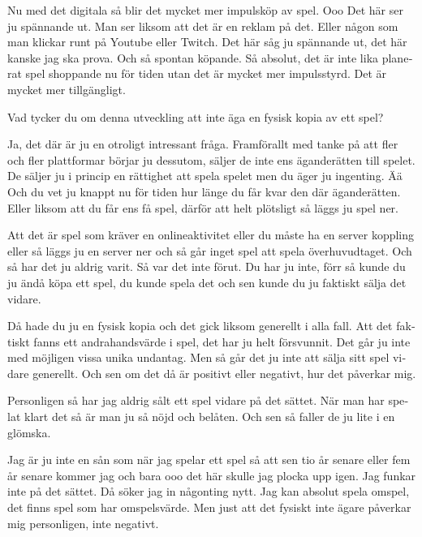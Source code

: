 \documentclass[11p]{article}
\begin{document}
\begin{otherlanguage}{swedish}
        Nu med det digitala så blir det mycket mer impulsköp av spel. Ooo Det här ser ju spännande ut.
        Man ser liksom att det är en reklam på det. Eller någon som man klickar runt på  Youtube eller Twitch. Det här såg ju spännande ut, det här kanske jag ska prova. Och så spontan köpande.
        Så absolut, det är inte lika planerat spel shoppande nu för tiden utan det är mycket mer impulsstyrd. Det är mycket mer tillgängligt.


        \setlength{\leftskip}{0cm}
        Vad tycker du om denna utveckling att inte äga en fysisk kopia av ett spel?

        \setlength{\leftskip}{1cm}

        Ja, det där är ju en otroligt intressant fråga.
        Framförallt med tanke på att fler och fler plattformar börjar ju dessutom, säljer de inte ens äganderätten till spelet.
        De säljer ju i princip en rättighet att spela spelet men du äger ju ingenting. Ää Och du vet ju knappt nu för tiden hur länge du får kvar den där äganderätten.
        Eller liksom att du får ens få spel, därför att helt plötsligt så läggs ju spel ner.

        Att det är spel som kräver en onlineaktivitet eller du måste ha en server koppling eller så läggs ju en server ner och så går inget spel att spela överhuvudtaget. Och så har det ju aldrig varit.
        Så var det inte förut. Du har ju inte, förr så kunde du ju ändå köpa ett spel, du kunde spela det och sen kunde du ju faktiskt sälja det vidare.

        Då hade du ju en fysisk kopia och det gick liksom generellt i alla fall. Att det faktiskt fanns ett andrahandsvärde i spel, det har ju helt försvunnit.
        Det går ju inte med möjligen vissa unika undantag. Men så går det ju inte att sälja sitt spel vidare generellt.
        Och sen om det då är positivt eller negativt, hur det påverkar mig.

        Personligen så har jag aldrig sålt ett spel vidare på det sättet.
        När man har spelat klart det så är man ju så nöjd och belåten. Och sen så faller de ju lite i en glömska.

        Jag är ju inte en sån som när jag spelar ett spel så att sen tio år senare eller fem år senare kommer jag och bara ooo det här skulle jag plocka upp igen. Jag funkar inte på det sättet. Då söker jag in någonting nytt. Jag kan absolut spela omspel, det finns spel som har omspelsvärde.
        Men just att det fysiskt inte ägare påverkar mig personligen, inte negativt.


\end{otherlanguage}
\end{document}
